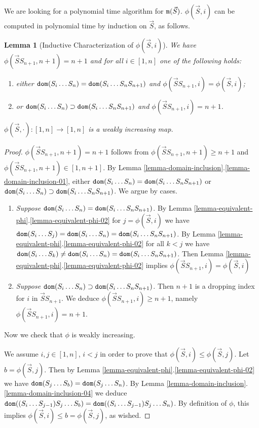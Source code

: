 \documentclass{lmcs}
\newtheorem{lemma}[theorem]{Lemma}
\begin{document}
We are looking for a polynomial time algorithm for ${\tt m}(\vec{S})$.
$\phi(\vec{S},i)$ can be computed in polynomial time
by induction on $\vec{S}$, as follows. 

\begin{lemma}[Inductive Characterization of $\phi(\vec{S},i)$]
\label{lemma-phi-characterization}
We have $\phi(\vec{S} S_{n+1}, n+1) = n+1$ and for all $i \in [1,n]$
one of the following holds:
\begin{enumerate}
\item
either ${\tt dom}(S_i \ldots S_n) = {\tt dom}(S_i \ldots S_n S_{n+1})$
and $\phi(\vec{S}S_{n+1},i) = \phi(\vec{S},i)$;
\item
or ${\tt dom}(S_i \ldots S_n) \supset {\tt dom}(S_i \ldots S_n S_{n+1})$
and $\phi(\vec{S}S_{n+1},i) = n+1$.
\end{enumerate}
$\phi(\vec{S},\cdot):[1,n] \rightarrow [1,n]$ is a weakly increasing map.
\end{lemma}

\begin{proof}
$\phi(\vec{S} S_{n+1}, n+1) = n+1$ follows from $\phi(\vec{S} S_{n+1}, n+1) \ge n+1$
and $\phi(\vec{S} S_{n+1}, n+1) \in [1,n+1]$. 
By Lemma \ref{lemma-domain-inclusion}.\ref{lemma-domain-inclusion-01}, 
either ${\tt dom}(S_i \ldots S_n) = {\tt dom}(S_i \ldots S_n S_{n+1})$ 
or ${\tt dom}(S_i \ldots S_n) \supset {\tt dom}(S_i \ldots S_n S_{n+1})$. 
We argue by cases.

\begin{enumerate}
\item
\emph{Suppose ${\tt dom}(S_i \ldots S_n) = {\tt dom}(S_i \ldots S_n S_{n+1})$}.
By Lemma \ref{lemma-equivalent-phi}.\ref{lemma-equivalent-phi-02} 
for $j = \phi(\vec{S},i)$
we have ${\tt dom}(S_i \ldots S_j) = {\tt dom}(S_i \ldots S_n) = {\tt dom}(S_i \ldots S_n S_{n+1})$.
By Lemma \ref{lemma-equivalent-phi}.\ref{lemma-equivalent-phi-02} 
for all $k<j$ we have 
${\tt dom}(S_i \ldots S_k) \not = {\tt dom}(S_i \ldots S_n) = {\tt dom}(S_i \ldots S_n S_{n+1})$.
Then Lemma \ref{lemma-equivalent-phi}.\ref{lemma-equivalent-phi-02} 
implies $\phi(\vec{S}S_{n+1},i) = \phi(\vec{S},i)$

\item
\emph{Suppose ${\tt dom}(S_i \ldots S_n) \supset {\tt dom}(S_i \ldots S_n S_{n+1})$}.
Then $n+1$ is a dropping index for $i$ in $\vec{S} S_{n+1}$.
We deduce $\phi(\vec{S}S_{n+1}, i) \ge n+1$,
namely $\phi(\vec{S}S_{n+1}, i) = n+1$.

\end{enumerate}

Now we check that $\phi$ is weakly increasing.

We assume $i,j \in [1,n]$, $i < j$ in order to prove that $\phi(\vec{S},i) \le \phi(\vec{S},j)$.
Let $b =  \phi(\vec{S},j)$. 
Then by Lemma \ref{lemma-equivalent-phi}.\ref{lemma-equivalent-phi-02} we have 
${\tt dom}(S_j \ldots S_b) = {\tt dom}(S_j \ldots S_n)$. 
By Lemma \ref{lemma-domain-inclusion}.\ref{lemma-domain-inclusion-04} we deduce
${\tt dom}((S_i \ldots S_{j-1}) S_j \ldots S_b) = {\tt dom}((S_i \ldots S_{j-1}) S_j \ldots S_n)$.
By definition of $\phi$, this implies $\phi(\vec{S},i) \le b =  \phi(\vec{S},j)$,
as wished.
\end{proof}
\end{document}
